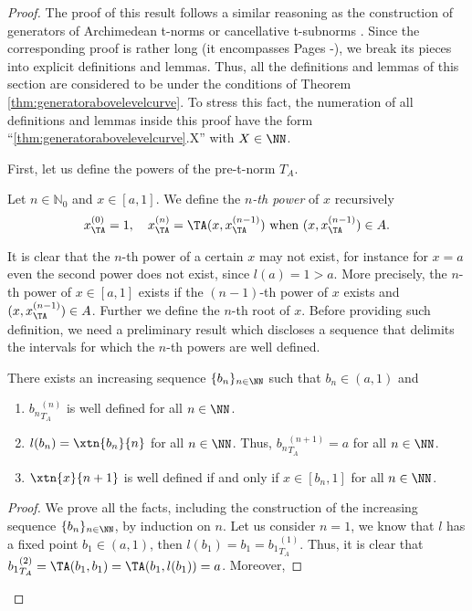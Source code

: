 \begin{proof}
	The proof of this result follows a similar reasoning as the construction of generators of Archimedean t-norms \cite{Aczel1948,Alsina2006,Klement2000} or cancellative t-subnorms \cite{Mesiarova2002}. Since the corresponding proof is rather long (it encompasses Pages \pageref{subdef:powersofpretnorm}-\pageref{ex:TP:construction-abovelevelcurve}), we break its pieces into explicit definitions and lemmas. Thus, all the definitions and lemmas of this section are considered to be under the conditions of Theorem \ref{thm:generatorabovelevelcurve}. To stress this fact, the numeration of all definitions and lemmas inside this proof have the form ``\ref{thm:generatorabovelevelcurve}.X'' with $X \in \NN$.
	
	First, let us define the powers of the pre-t-norm $T_A$.
	\begin{subdefinition}\label{subdef:powersofpretnorm} Let $n \in \mathbb{N}_0$ and $x \in [a,1]$. We define the \emph{$n$-th power} of $x$ recursively
		$$x_{\TA}^{(0)}=1, \quad  x_{\TA}^{(n)}=\TA(x,x_{\TA}^{(n-1)}) \text{ when } (x,x_{\TA}^{(n-1)}) \in A.$$                                                                                   	
	\end{subdefinition}
	It is clear that the $n$-th power of a certain $x$ may not exist, for instance for $x=a$ even the second power does not exist, since $l(a)=1 >a$. More precisely, the $n$-th power of $x \in [a,1]$ exists if the $(n-1)$-th power of $x$ exists and $\displaystyle (x,x_{\TA}^{(n-1)}) \in A$. Further we define the $n$-th root of $x$. Before providing such definition, we need a preliminary result which discloses a sequence that delimits the intervals for which the $n$-th powers are well defined.
	\begin{sublemma}\label{lem:sequence}
		There exists an increasing sequence $\{b_n\}_{n \in \NN}$ such that $b_n \in (a,1)$ and
		\begin{enumerate}[label=(\roman*)]
			\item ${b_n}_{T_A}^{(n)}$ is well defined for all $n \in \NN$.
			\item $l(b_n)=\xtn{{b_n}}{n}$ for all $n \in \NN$. Thus, ${b_n}_{T_A}^{(n+1)} = a$ for all $n \in \NN$.
			\item $\xtn{x}{n+1}$ is well defined if and only if $x \in [b_n,1]$ for all $n \in \NN$.
		\end{enumerate}
	\end{sublemma}
	\begin{proof}
		We prove all the facts, including the construction of the increasing sequence $\{b_n\}_{n \in \NN}$, by induction on $n$.  Let us consider $n=1$, we know that $l$ has a fixed point $b_1 \in (a,1)$, then $l(b_1)=b_1={b_1}_{T_A}^{(1)}$. Thus, it is clear that ${b_1}_{T_A}^{(2)} = \TA(b_1,b_1)=\TA(b_1,l(b_1))=a$.  Moreover,

\end{proof}
\end{proof}
